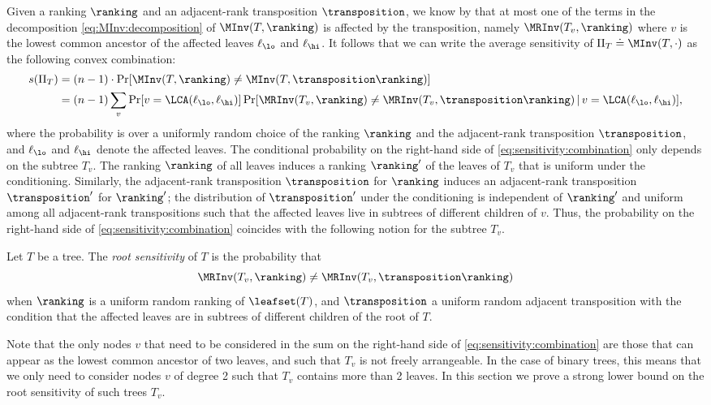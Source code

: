 Given a ranking $\ranking$ and an adjacent-rank transposition $\transposition$, we know by  that at most one of the terms in the decomposition \eqref{eq:MInv:decomposition} of $\MInv(T,\ranking)$ is affected by the transposition, namely $\MRInv(T_v,\ranking)$ where $v$ is the lowest common ancestor of the affected leaves $\ell_\lo$ and $\ell_\hi$. It follows that we can write the average sensitivity of $\Pi_T \doteq \MInv(T,\cdot)$ as the following convex combination:
\begin{align}\label{eq:sensitivity:combination}
s(\Pi_T) & = (n-1) \cdot \Pr[ \MInv(T,\ranking) \ne \MInv(T,\transposition \ranking)] \nonumber \\
& = (n-1) \sum_v \Pr[ v = \LCA(\ell_\lo,\ell_\hi) ] \Pr[ \MRInv(T_v,\ranking) \ne \MRInv(T_v,\transposition \ranking) \, | \, 
v = \LCA(\ell_\lo,\ell_\hi)], 
\end{align}
where the probability is over a uniformly random choice of the ranking $\ranking$ and the adjacent-rank transposition $\transposition$, and $\ell_\lo$ and $\ell_\hi$ denote the affected leaves. The conditional probability on the right-hand side of \eqref{eq:sensitivity:combination} only depends on the subtree $T_v$. The ranking $\ranking$ of all leaves induces a ranking $\ranking'$ of the leaves of $T_v$ that is uniform under the conditioning. Similarly, the adjacent-rank transposition $\transposition$ for $\ranking$ induces an adjacent-rank transposition $\transposition'$ for $\ranking'$; the distribution of $\transposition'$ under the conditioning is independent of $\ranking'$ and uniform among all adjacent-rank transpositions such that the affected leaves live in subtrees of different children of $v$. Thus, the probability on the right-hand side of \eqref{eq:sensitivity:combination} coincides with the following notion for the subtree $T_v$.
\begin{definition}\label{def:root-sensitivity}
Let $T$ be a tree. The \emph{root sensitivity} of $T$ is the probability that 
\[\MRInv(T_v,\ranking) \ne \MRInv(T_v,\transposition \ranking)\] 
when $\ranking$ is a uniform random  ranking of $\leafset(T)$, and $\transposition$ a uniform random adjacent transposition with the condition that the affected leaves are in subtrees of different children of the root of $T$.
\end{definition}
Note that the only nodes $v$ that need to be considered in the sum  on the right-hand side of \eqref{eq:sensitivity:combination} are those that can appear as the lowest common ancestor of two leaves, and such that $T_v$ is not freely arrangeable. In the case of binary trees, this means that we only need to consider nodes $v$ of degree 2 such that $T_v$ contains more than 2 leaves. In this section we prove a strong lower bound on the root sensitivity of such trees $T_v$.

